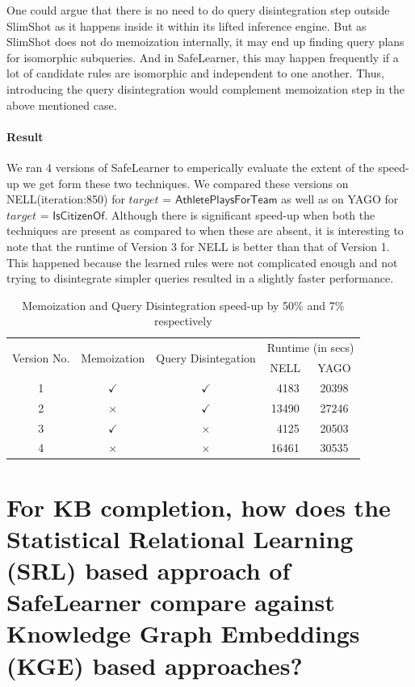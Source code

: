 \documentclass[akbc,twoside,11pt]{article}
\newcommand{\arcchit}[1]{\textcolor{red}{A: {#1}}}
\newcommand{\algorithmname}{SafeLearner\xspace}
\begin{document}
One could argue that there is no need to do query disintegration step outside SlimShot as it happens inside it within its lifted inference engine. But as SlimShot does not do memoization internally, it may end up finding query plans for isomorphic subqueries. And in \algorithmname, this may happen frequently if a lot of candidate rules are isomorphic and independent to one another. Thus, introducing the query disintegration would complement memoization step in the above mentioned case.

\paragraph{Result}
We ran 4 versions of \algorithmname to emperically evaluate the extent of the speed-up we get form these two techniques. We compared these versions on NELL(iteration:850) for $target$ = $\mathsf{AthletePlaysForTeam}$ as well as on YAGO for $target$ = $\mathsf{IsCitizenOf}$. Although there is significant speed-up when both the techniques are present as compared to when these are absent, it is interesting to note that the runtime of Version 3 for NELL is better than that of Version 1. This happened because the learned rules were not complicated enough and not trying to disintegrate simpler queries resulted in a slightly faster performance.

\begin{table}[H]
\centering
\begin{tabular}{|c|c|c|c|c|}
\hline
\multirow{2}{*}{Version No.}	& \multirow{2}{*}{Memoization}	 & \multirow{2}{*}{Query Disintegation} &	 \multicolumn{2}{c|}{Runtime (in secs)}\\
\cline{4-5}
& & & NELL & YAGO \\
\hline
1 & $\checkmark$ & $\checkmark$ & \ 4183 & 20398\\
2 & $\times$ & $\checkmark$ & 13490 & 27246\\
3 & $\checkmark$ & $\times$ & \ 4125 & 20503\\
4 & $\times$ & $\times$ & 16461 & 30535\\
\hline
\end{tabular}
\caption{Memoization and Query Disintegration speed-up by 50\% and 7\% respectively}\label{table:speedup}
\end{table}

\section{For KB completion, how does the Statistical Relational Learning (SRL) based approach of \algorithmname compare against Knowledge Graph Embeddings (KGE) based approaches?}\label{appendix:5}
\end{document}
